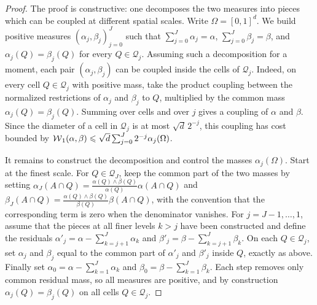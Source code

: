\begin{proof}
	The proof is constructive: one decomposes the two measures into pieces which can be coupled at different spatial scales. Write \(\Omega=[0,1]^d\). We build positive measures \((\alpha_j,\beta_j)_{j=0}^J\) such that \(\sum_{j=0}^J\alpha_j=\alpha\), \(\sum_{j=0}^J\beta_j=\beta\), and \(\alpha_j(Q)=\beta_j(Q)\) for every \(Q\in\mathcal Q_j\).
	Assuming such a decomposition for a moment, each pair \((\alpha_j,\beta_j)\) can be coupled inside the cells of \(\mathcal Q_j\). Indeed, on every cell \(Q\in\mathcal Q_j\) with positive mass, take the product coupling between the normalized restrictions of \(\alpha_j\) and \(\beta_j\) to \(Q\), multiplied by the common mass \(\alpha_j(Q)=\beta_j(Q)\). Summing over cells and over \(j\) gives a coupling of \(\alpha\) and \(\beta\). Since the diameter of a cell in \(\mathcal Q_j\) is at most \(\sqrt d\,2^{-j}\), this coupling has cost bounded by
	$\operatorname{\mathcal{W}}_1(\alpha,\beta) \leqslant \sqrt d\sum_{j=0}^J2^{-j}\alpha_j(\Omega)$.

	It remains to construct the decomposition and control the masses \(\alpha_j(\Omega)\). Start at the finest scale. For \(Q\in\mathcal Q_J\), keep the common part of the two masses by setting \(\alpha_J(A\cap Q)=\frac{\alpha(Q)\wedge\beta(Q)}{\alpha(Q)}\alpha(A\cap Q)\) and \(\beta_J(A\cap Q)=\frac{\alpha(Q)\wedge\beta(Q)}{\beta(Q)}\beta(A\cap Q)\), with the convention that the corresponding term is zero when the denominator vanishes. For \(j=J-1,\ldots,1\), assume that the pieces at all finer levels \(k>j\) have been constructed and define the residuals \(\alpha'_j=\alpha-\sum_{k=j+1}^J\alpha_k\) and \(\beta'_j=\beta-\sum_{k=j+1}^J\beta_k\).
	On each \(Q\in\mathcal Q_j\), set \(\alpha_j\) and \(\beta_j\) equal to the common part of \(\alpha'_j\) and \(\beta'_j\) inside \(Q\), exactly as above. Finally set \(\alpha_0=\alpha-\sum_{k=1}^J\alpha_k\) and \(\beta_0=\beta-\sum_{k=1}^J\beta_k\). Each step removes only common residual mass, so all measures are positive, and by construction \(\alpha_j(Q)=\beta_j(Q)\) on all cells \(Q\in\mathcal Q_j\).


\end{proof}
